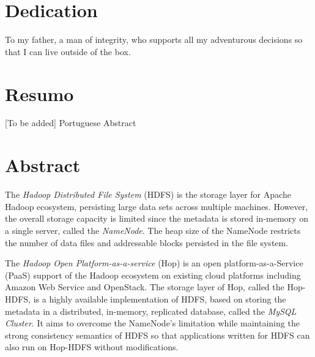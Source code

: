 \cleardoublepage


\chapter*{Dedication}
\thispagestyle{empty}

\vfill
\mbox{}
\vfill\Large
\begin{flushright}
  \begin{minipage}{8cm}
    \begin{center}
	To my father, a man of integrity, who supports all my adventurous decisions so that I can live outside of the box.

    \end{center}
  \end{minipage}
\end{flushright}
\normalsize\vfill

\cleardoublepage


\chapter*{Resumo}
\thispagestyle{empty}

[To be added] Portuguese Abstract

\newpage


\chapter*{Abstract}
\thispagestyle{empty}

The \textit{Hadoop Distributed File System} (HDFS) is the storage layer for Apache Hadoop ecosystem, persisting large data sets across multiple machines. However, the overall storage capacity is limited since the metadata is stored in-memory on a single server, called the \textit{NameNode}. The heap size of the NameNode restricts the number of data files and addressable blocks persisted in the file system.

\noindent The \textit{Hadoop Open Platform-as-a-service} (Hop) is an open platform-as-a-Service (PaaS) support of the Hadoop ecosystem on existing cloud platforms including Amazon Web Service and OpenStack. The storage layer of Hop, called the Hop-HDFS, is a highly available implementation of HDFS, based on storing the metadata in a distributed, in-memory, replicated database, called the \textit{MySQL Cluster}. It aims to overcome the NameNode's limitation  while maintaining the strong consistency semantics of HDFS so that applications written for HDFS can also run on Hop-HDFS without 
modifications.

